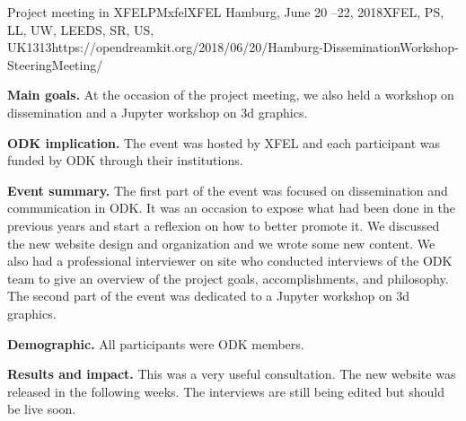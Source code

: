 \begin{event}{Project meeting in XFEL}{PMxfel}{XFEL Hamburg, June 20 --22, 2018}{XFEL, PS, LL, UW, LEEDS, SR, US, UK}{13}{13}{https://opendreamkit.org/2018/06/20/Hamburg-DisseminationWorkshop-SteeringMeeting/}

\textbf{Main goals.} At the occasion of the project meeting, we also held a workshop on dissemination and a Jupyter workshop on 3d graphics.

\textbf{ODK implication.} The event was hosted by XFEL and each participant was funded by ODK through their institutions.

\textbf{Event summary.} The first part of the event was focused on dissemination and communication in ODK. It was an occasion to expose what had been done in the previous years and start a reflexion on how to better promote it. We discussed the new website design and organization and we wrote some new content. We also had a professional interviewer on site who conducted interviews of the ODK team to give an overview of the project goals, accomplishments, and philosophy. The second part of the event was dedicated to a Jupyter workshop on 3d graphics.

\textbf{Demographic.} All participants were ODK members.

\textbf{Results and impact.} This was a very useful consultation. The new website was released in the following weeks. The interviews are still being edited but should be live soon.


\end{event}